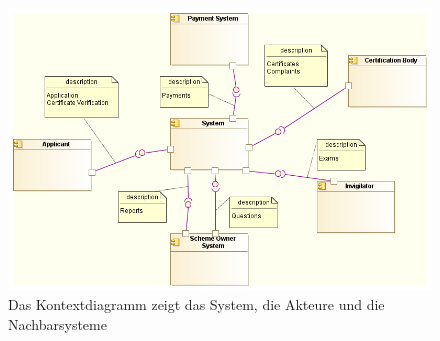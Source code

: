 \begin{figure}[H]
    \centering
    \includegraphics[scale=0.5]{uml/context.png}
    \caption{Das Kontextdiagramm zeigt das System, die Akteure und die Nachbarsysteme}
\end{figure}